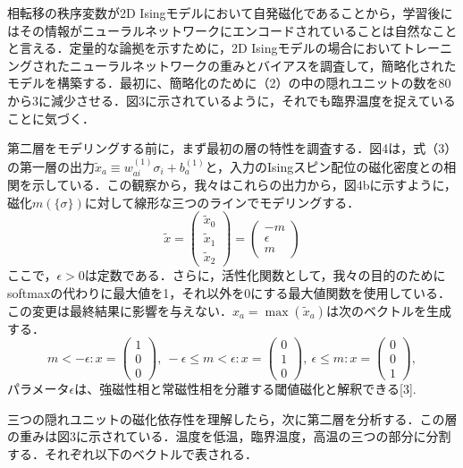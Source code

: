 \documentclass[a4paper,11pt]{jsarticle}
\begin{document}
相転移の秩序変数が2D Isingモデルにおいて自発磁化であることから，学習後にはその情報がニューラルネットワークにエンコードされていることは自然なことと言える．定量的な論拠を示すために，2D Isingモデルの場合においてトレーニングされたニューラルネットワークの重みとバイアスを調査して，簡略化されたモデルを構築する．最初に、簡略化のために（2）の中の隠れユニットの数を80から3に減少させる．図3に示されているように，それでも臨界温度を捉えていることに気づく．\par
第二層をモデリングする前に，まず最初の層の特性を調査する．図4は，式（3）の第一層の出力$\tilde{x}_a \equiv w_{ai}^{(1)}\sigma_i + b_a^{(1)}$と，入力のIsingスピン配位の磁化密度との相関を示している．この観察から，我々はこれらの出力から，図4bに示すように，磁化$m(\{ \sigma \})$に対して線形な三つのラインでモデリングする．
\begin{equation}
  \tilde{x} =
  \begin{pmatrix}
    \tilde{x}_0 \\ \tilde{x}_1 \\ \tilde{x}_2
  \end{pmatrix}
  =
  \begin{pmatrix}
    -m \\ \epsilon \\ m
  \end{pmatrix}
\end{equation}
ここで，$\epsilon > 0$は定数である．さらに，活性化関数として，我々の目的のためにsoftmaxの代わりに最大値を1，それ以外を0にする最大値関数を使用している．この変更は最終結果に影響を与えない．$x_a = \max{(\tilde{x}_a)}$は次のベクトルを生成する．
\begin{equation}
  m<-\epsilon : x=
  \begin{pmatrix}
    1 \\ 0 \\ 0
  \end{pmatrix}, \
  -\epsilon \leq m < \epsilon : x=
  \begin{pmatrix}
    0 \\ 1 \\ 0
  \end{pmatrix}, \
  \epsilon \leq m : x=
  \begin{pmatrix}
    0 \\ 0 \\ 1
  \end{pmatrix},
\end{equation}
パラメータ$\epsilon$は、強磁性相と常磁性相を分離する閾値磁化と解釈できる[3].\par
三つの隠れユニットの磁化依存性を理解したら，次に第二層を分析する．この層の重みは図3に示されている．温度を低温，臨界温度，高温の三つの部分に分割する．それぞれ以下のベクトルで表される．
\end{document}

